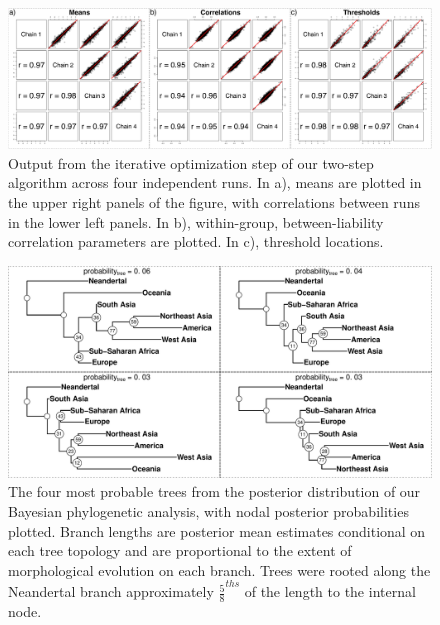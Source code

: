 \begin{figure}[h]
\centering
\includegraphics[width=160mm]{figures/chpt4_figure3.pdf}
\caption[Optimization Output from Four Runs of Discrete Dental Analysis]{Output from the iterative optimization step of our two-step algorithm across four independent runs. In a), means are plotted in the upper right panels of the figure, with correlations between runs in the lower left panels. In b), within-group, between-liability correlation parameters are plotted. In c), threshold locations.  
\label{fig:empiricalOptimOutput}
\label{overflow}}
\end{figure}

\begin{figure}[h]
\centering
\includegraphics[width=160mm]{figures/dental_top4trees.pdf}
\caption[Top Four Tree Topologies from Discrete Dental Phylogenetic Analysis]{The four most probable trees from the posterior distribution of our Bayesian phylogenetic analysis, with nodal posterior probabilities plotted. Branch lengths are posterior mean estimates conditional on  each tree topology and are proportional to the extent of morphological evolution on each branch. Trees were rooted along the Neandertal branch approximately $\frac{5}{8}^{ths}$ of the length to the internal node.  
\label{overflow}
\label{fig:top4treesDENTAL}}
\end{figure}

